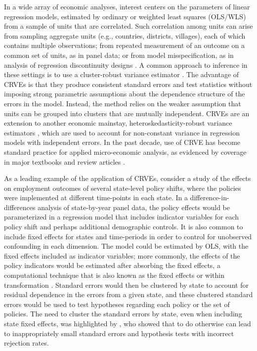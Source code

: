 \documentclass[12pt]{article}
\begin{document}
In a wide array of economic analyses, interest centers on the parameters of linear regression models, estimated by ordinary or weighted least squares (OLS/WLS) from a sample of units that are correlated. 
Such correlation among units can arise from sampling aggregate units (e.g., countries, districts, villages), each of which contains multiple observations; from repeated measurement of an outcome on a common set of units, as in panel data; or from model misspecification, as in analysis of regression discontinuity designs \citep[e.g.,][]{Lee2008regression}. 
A common approach to inference in these settings is to use a cluster-robust variance estimator \citep[CRVE;][]{Arellano1987computing, Liang1986longitudinal, white1984asymptotic}.
The advantage of CRVEs is that they produce consistent standard errors and test statistics without imposing strong parametric assumptions about the dependence structure of the errors in the model.
Instead, the method relies on the weaker assumption that units can be grouped into clusters that are mutually independent. 
CRVEs are an extension to another economic mainstay, heteroskedasticity-robust variance estimators \citep{eicker1967limit, Huber1967behavior, White1980heteroskedasticity}, which are used to account for non-constant variance in regression models with independent errors.
In the past decade, use of CRVE has become standard practice for applied micro-economic analysis, as evidenced by coverage in major textbooks and review articles \citep[e.g.,][]{Wooldridge2010econometric, Angrist2009mostly, Cameron2015practitioners}.

As a leading example of the application of CRVEs, consider a study of the effects on employment outcomes of several state-level policy shifts, where the policies were implemented at different time-points in each state. 
In a difference-in-differences analysis of state-by-year panel data, the policy effects would be parameterized in a regression model that includes indicator variables for each policy shift and perhaps additional demographic controls. It is also common to include fixed effects for states and time-periods in order to control for unobserved confounding in each dimension. 
The model could be estimated by OLS, with the fixed effects included as indicator variables; more commonly, the effects of the policy indicators would be estimated after absorbing the fixed effects, a computational technique that is also known as the fixed effects or within transformation \citep{Wooldridge2010econometric}. 
Standard errors would then be clustered by state to account for residual dependence in the errors from a given state, and these clustered standard errors would be used to test hypotheses regarding each policy or the set of policies.
The need to cluster the standard errors by state, even when including state fixed effects, was highlighted by \citet{Bertrand2004how}, who showed that to do otherwise can lead to inappropriately small standard errors and hypothesis tests with incorrect rejection rates. 
\end{document}
